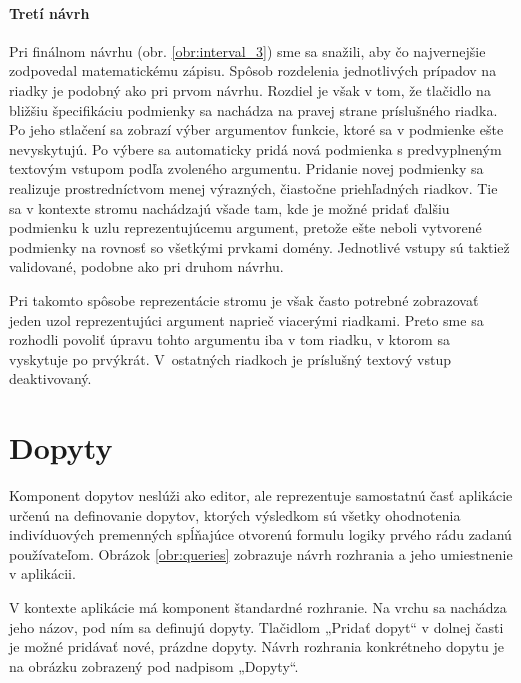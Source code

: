 \paragraph{Tretí návrh}
Pri finálnom návrhu (obr. \ref{obr:interval_3}) sme sa snažili, aby čo najvernejšie zodpovedal matematickému zápisu. Spôsob rozdelenia jednotlivých prípadov na riadky je podobný ako pri prvom návrhu. Rozdiel je však v tom, že tlačidlo na bližšiu špecifikáciu podmienky sa nachádza na pravej strane príslušného riadka. Po jeho stlačení sa zobrazí výber argumentov funkcie, ktoré sa v podmienke ešte nevyskytujú. Po výbere sa automaticky pridá nová podmienka s predvyplneným textovým vstupom podľa zvoleného argumentu. Pridanie novej podmienky sa realizuje prostredníctvom menej výrazných, čiastočne priehľadných riadkov. Tie sa v kontexte stromu nachádzajú všade tam, kde je možné pridať ďalšiu podmienku k uzlu reprezentujúcemu argument, pretože ešte neboli vytvorené podmienky na rovnosť so všetkými prvkami domény. Jednotlivé vstupy sú taktiež validované, podobne ako pri druhom návrhu.


Pri takomto spôsobe reprezentácie stromu je však často potrebné zobrazovať jeden uzol reprezentujúci argument naprieč viacerými riadkami. Preto sme sa rozhodli povoliť úpravu tohto argumentu iba v tom riadku, v ktorom sa vyskytuje po prvýkrát. V~ostatných riadkoch je príslušný textový vstup deaktivovaný.


\section{Dopyty}
\label{sec:plan-queries}

Komponent dopytov neslúži ako editor, ale reprezentuje samostatnú časť aplikácie určenú na definovanie dopytov, ktorých výsledkom sú všetky ohodnotenia indivíduových premenných spĺňajúce otvorenú formulu logiky prvého rádu zadanú používateľom. Obrázok \ref{obr:queries} zobrazuje návrh rozhrania a jeho umiestnenie v aplikácii.

V kontexte aplikácie má komponent štandardné rozhranie. Na vrchu sa nachádza jeho názov, pod ním sa definujú dopyty. Tlačidlom „Pridať dopyt“ v dolnej časti je možné pridávať nové, prázdne dopyty. Návrh rozhrania konkrétneho dopytu je na obrázku zobrazený pod nadpisom „Dopyty“.

